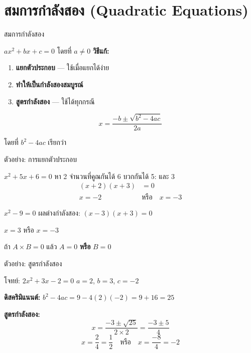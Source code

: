 \documentclass[11pt, aspectratio=169]{beamer}
\begin{document}
\section{สมการกำลังสอง (Quadratic Equations)}

\begin{frame}{สมการกำลังสอง}
  \begin{explanation}
    $ax^2 + bx + c = 0$ \quad โดยที่ $a \neq 0$
    \textbf{วิธีแก้:}
    \begin{enumerate}
      \item \textbf{แยกตัวประกอบ} — ใช้เมื่อแยกได้ง่าย
      \item \textbf{ทำให้เป็นกำลังสองสมบูรณ์}
      \item \textbf{สูตรกำลังสอง} — ใช้ได้ทุกกรณี
    \end{enumerate}
  \end{explanation}

  \begin{explanation}
    \[
      x = \frac{-b \pm \sqrt{b^2 - 4ac}}{2a}
    \]

    โดยที่ $b^2 - 4ac$ เรียกว่า 
  \end{explanation}
\end{frame}

\begin{frame}{ตัวอย่าง: การแยกตัวประกอบ}
  \begin{exambox}
    $x^2 + 5x + 6 = 0$
    หา 2 จำนวนที่คูณกันได้ 6 บวกกันได้ 5:  และ 3
    \begin{align*}
      (x + 2)(x + 3) &= 0 \\
      x = -2 \quad &\text{หรือ} \quad x = -3
    \end{align*}
  \end{exambox}

  \begin{exambox}
    $x^2 - 9 = 0$
    ผลต่างกำลังสอง: \quad $(x - 3)(x + 3) = 0$

    $x = 3$ หรือ $x = -3$
  \end{exambox}

  \begin{intuition}
    ถ้า $A \times B = 0$ แล้ว $A = 0$ \textbf{หรือ} $B = 0$
  \end{intuition}
\end{frame}

\begin{frame}{ตัวอย่าง: สูตรกำลังสอง}
  \begin{exambox}
    โจทย์: $2x^2 + 3x - 2 = 0$
    $a = 2$, $b = 3$, $c = -2$

    \textbf{ดิสคริมิแนนต์:} $b^2 - 4ac = 9 - 4(2)(-2) = 9 + 16 = 25$

    \textbf{สูตรกำลังสอง:}
    \[
      x = \frac{-3 \pm \sqrt{25}}{2 \times 2} = \frac{-3 \pm 5}{4}
    \]
    \[
      x = \frac{2}{4} = \frac{1}{2} \quad \text{หรือ} \quad x = \frac{-8}{4} = -2
    \]
  \end{exambox}
\end{frame}
\end{document}
